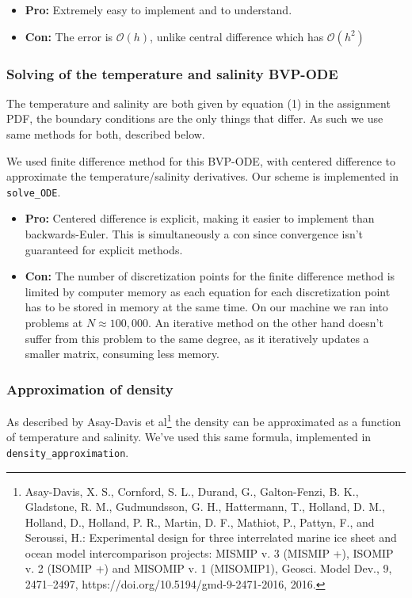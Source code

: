 \documentclass{article}
\begin{document}
\begin{itemize}
    \item[] \textbf{Pro:} Extremely easy to implement and to understand.
    \item[] \textbf{Con:} The error is $\mathcal{O}(h)$, unlike central difference which has $\mathcal{O}(h^2)$
\end{itemize}

\subsubsection*{Solving of the temperature and salinity BVP-ODE}

The temperature and salinity are both given by equation (1) in the assignment PDF, the boundary conditions are the only things that differ. As such we use same methods for both, described below.

\noindent We used finite difference method for this BVP-ODE, with centered difference to approximate the temperature/salinity derivatives. Our scheme is implemented in \texttt{solve\_ODE}.

\begin{itemize}
    \item[] \textbf{Pro:} Centered difference is explicit, making it easier to implement than backwards-Euler. This is simultaneously a con since convergence isn't guaranteed for explicit methods.
    \item[] \textbf{Con:} The number of discretization points for the finite difference method is limited by computer memory as each equation for each discretization point has to be stored in memory at the same time. On our machine we ran into problems at $N \approx 100,000$. An iterative method on the other hand doesn't suffer from this problem to the same degree, as it iteratively updates a smaller matrix, consuming less memory.
\end{itemize}

\subsubsection*{Approximation of density}

As described by Asay-Davis et al\footnote{Asay-Davis, X. S., Cornford, S. L., Durand, G., Galton-Fenzi, B. K., Gladstone, R. M., Gudmundsson, G. H., Hattermann, T., Holland, D. M., Holland, D., Holland, P. R., Martin, D. F., Mathiot, P., Pattyn, F., and Seroussi, H.: Experimental design for three interrelated marine ice sheet and ocean model intercomparison projects: MISMIP v. 3 (MISMIP +), ISOMIP v. 2 (ISOMIP +) and MISOMIP v. 1 (MISOMIP1), Geosci. Model Dev., 9, 2471–2497, https://doi.org/10.5194/gmd-9-2471-2016, 2016. } the density can be approximated as a function of temperature and salinity. We've used this same formula, implemented in \texttt{density\_approximation}.
\end{document}
